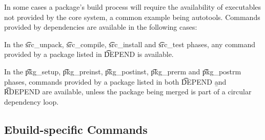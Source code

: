 In some cases a package's build process will require the availability of executables not provided by
the core system, a common example being autotools. Commands provided by dependencies are available
in the following cases:
\begin{bulletlist}
\item In the \t{src\_unpack}, \t{src\_compile}, \t{src\_install} and \t{src\_test} phases, any
    command provided by a package listed in \t{DEPEND} is available.
\item In the \t{pkg\_setup}, \t{pkg\_preinst}, \t{pkg\_postinst}, \t{pkg\_prerm} and \t{pkg\_postrm}
    phases, commands provided by a package listed in both \t{DEPEND} \b{and} \t{RDEPEND} are
    available, unless the package being merged is part of a circular dependency loop.
\end{bulletlist}

\subsection{Ebuild-specific Commands}



